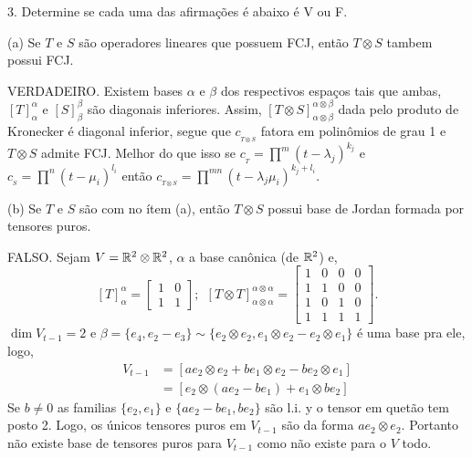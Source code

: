3. Determine se cada uma das afirmações é abaixo é V ou F. 

(a) Se \(T\) e \(S\) são operadores lineares que possuem FCJ, então \(T\otimes S\) tambem possui FCJ.  

\textcolor{gris}{VERDADEIRO. Existem bases \(\alpha\) e \(\beta\) dos respectivos espaços tais que ambas, \( [T]_\alpha^\alpha\) e \([S]_\beta^\beta\) são diagonais inferiores. Assim, \([T\otimes S]_{\alpha\otimes \beta}^{\alpha\otimes \beta}\) dada  pelo produto de Kronecker é diagonal inferior, segue que \(c_{_{T\otimes S}}\) fatora em polinômios de grau 1 e \(T\otimes S\) admite FCJ. Melhor do que isso se \(c_{_T} = \prod^m (t-\lambda_j)^{k_j}\) e \(c_{_S} = \prod^n (t-\mu_i)^{l_i}\) então \(c_{_{T\otimes S}} = \prod^{mn} (t-\lambda_j\mu_i)^{k_j+l_i}\).     
}

(b) Se \(T\) e \(S\) são com no ítem (a), então \(T\otimes S\) possui base de Jordan formada por tensores puros.  

\textcolor{gris}{FALSO. Sejam \(V=\mathbb{R}^2\otimes \mathbb{R}^2\), \(\alpha \) a base canônica (de \(\mathbb{R}^2\)) e, 
\[[T]^\alpha_\alpha = \begin{bmatrix}
1 & 0 \\ 
1 & 1 
\end{bmatrix}; \ \ [T\otimes T]^{\alpha \otimes \alpha}_{\alpha \otimes \alpha} = \begin{bmatrix}
 1 & 0 & 0 & 0 \\ 
 1 & 1 & 0 & 0 \\ 
 1 & 0 & 1 & 0 \\ 
 1 & 1 & 1 & 1  
\end{bmatrix}.\]
\(\dim V_{t-1} = 2 \) e \(\beta = \{e_4, e_2-e_3\} \sim \{e_2 \otimes e_2, e_1 \otimes e_2 - e_2 \otimes e_1\}\) é uma base pra ele, logo,  
\begin{align*}
  V_{t-1} &= [ae_2\otimes e_2 + b e_1\otimes  e_2 - be_2 \otimes e_1] \\ 
   &= [e_2\otimes (ae_2 - be_1) +  e_1\otimes b e_2 ]  
\end{align*} 
Se \(b \neq 0\) as familias \(\{e_2, e_1\}\) e \( \{ae_2 -be_1, be_2\}\) são l.i. y o tensor em quetão tem posto 2. Logo, os únicos tensores puros em \(V_{t-1}\) são da forma \(a e_2 \otimes e_2\). Portanto não existe base de tensores puros para \(V_{t-1}\) como não existe para o \(V\) todo.  
}

